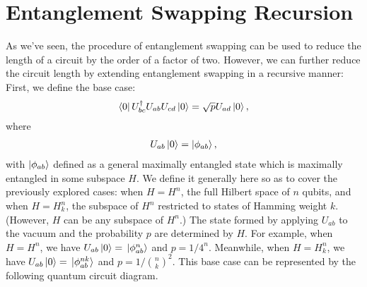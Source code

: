\documentclass[Dual]{msu-thesis}
\begin{document}
\section{Entanglement Swapping Recursion}

As we've seen, the procedure of entanglement swapping can be used to reduce the length of a circuit by the order of a factor of two. However, we can further reduce the circuit length by extending entanglement swapping in a recursive manner: First, we define the base case:
\begin{align}
\bra{0}U^\dagger_{bc}U_{ab}U_{cd}\ket{0}
=
\sqrt{p}U_{ad}\ket{0}
,\end{align}
where
\begin{align}
U_{ab}\ket{0}=\ket{\phi_{ab}}
,\end{align}
with $\ket{\phi_{ab}}$ defined as a general maximally entangled state which is maximally entangled in some subspace $H$. We define it generally here so as to cover the previously explored cases: when $H=H^n$, the full Hilbert space of $n$ qubits, and when $H=H^n_k$, the subspace of $H^n$ restricted to states of Hamming weight $k$. (However, $H$ can be any subspace of $H^n$.) The state formed by applying $U_{ab}$ to the vacuum and the probability $p$ are determined by $H$. For example, when $H=H^n$, we have $U_{ab}\ket{0}=\ket*{\phi^n_{ab}}$ and $p=1/4^n$. Meanwhile, when $H=H^n_k$, we have $U_{ab}\ket{0}=\ket*{\phi^{nk}_{ab}}$ and $p=1/{n \choose k}^2$. This base case can be represented by the following quantum circuit diagram.
\end{document}
